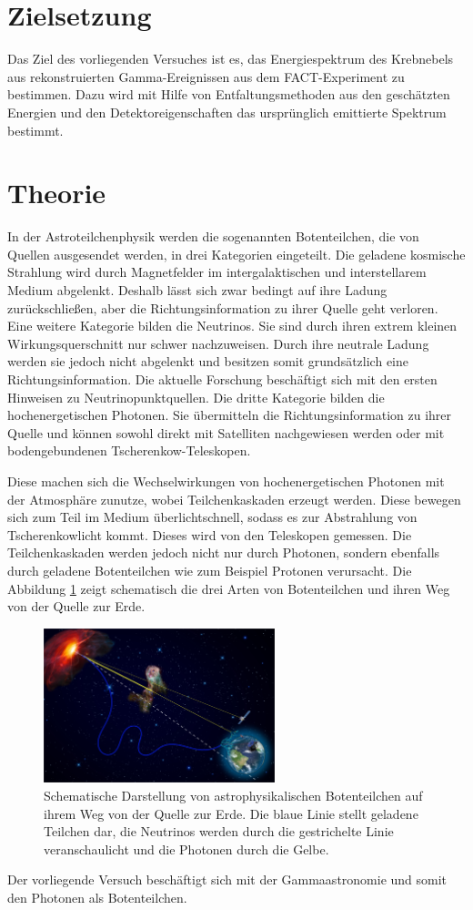 \section{Zielsetzung}
Das Ziel des vorliegenden Versuches ist es, das Energiespektrum des Krebnebels aus rekonstruierten Gamma-Ereignissen aus dem FACT-Experiment zu bestimmen. Dazu wird mit Hilfe von Entfaltungsmethoden aus den geschätzten Energien und den Detektoreigenschaften das ursprünglich emittierte Spektrum bestimmt.

\section{Theorie}
In der Astroteilchenphysik werden die sogenannten Botenteilchen, die von Quellen ausgesendet werden, in drei Kategorien eingeteilt. Die geladene kosmische Strahlung wird durch Magnetfelder im intergalaktischen und interstellarem Medium abgelenkt. Deshalb lässt sich zwar bedingt auf ihre Ladung zurückschließen, aber die Richtungsinformation zu ihrer Quelle geht verloren. Eine weitere Kategorie bilden die Neutrinos. Sie sind durch ihren extrem kleinen Wirkungsquerschnitt nur schwer nachzuweisen. Durch ihre neutrale Ladung werden sie jedoch nicht abgelenkt und besitzen somit grundsätzlich eine Richtungsinformation. Die aktuelle Forschung beschäftigt sich mit den ersten Hinweisen zu Neutrinopunktquellen. Die dritte Kategorie bilden die hochenergetischen Photonen. Sie übermitteln die Richtungsinformation zu ihrer Quelle und können sowohl direkt mit Satelliten nachgewiesen werden oder mit bodengebundenen Tscherenkow-Teleskopen.

Diese machen sich die Wechselwirkungen von hochenergetischen Photonen mit der Atmosphäre zunutze, wobei Teilchenkaskaden erzeugt werden. Diese bewegen sich zum Teil im Medium überlichtschnell, sodass es zur Abstrahlung von Tscherenkowlicht kommt. Dieses wird von den Teleskopen gemessen. Die Teilchenkaskaden werden jedoch nicht nur durch Photonen, sondern ebenfalls durch geladene Botenteilchen wie zum Beispiel Protonen verursacht. Die Abbildung \ref{fig:Boten} zeigt schematisch die drei Arten von Botenteilchen und ihren Weg von der Quelle zur Erde.\\
\begin{figure}
  \centering
  \includegraphics[width=0.6\textwidth]{graphics/Folie5.png}
  \caption{Schematische Darstellung von astrophysikalischen Botenteilchen auf ihrem Weg von der Quelle zur Erde. Die blaue Linie stellt geladene Teilchen dar, die Neutrinos werden durch die gestrichelte Linie veranschaulicht und die Photonen durch die Gelbe.\cite{anleitung}}
  \label{fig:Boten}
\end{figure}
Der vorliegende Versuch beschäftigt sich mit der Gammaastronomie und somit den Photonen als Botenteilchen.
